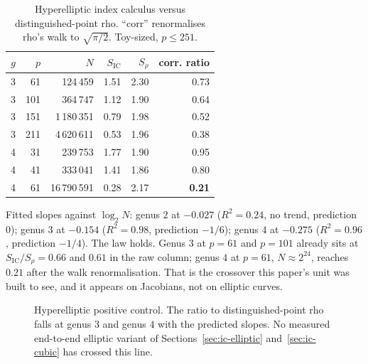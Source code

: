 \begin{table}[t]
\centering
\small
\caption{Hyperelliptic index calculus versus distinguished-point rho.
  ``corr'' renormalises rho's walk to $\sqrt{\pi/2}$. Toy-sized,
  $p\le 251$.}
\label{tab:hyper}
\begin{tabular}{@{}rrrrrr@{}}
\toprule
$g$ & $p$ & $N$ & $S_{\mathrm{IC}}$ & $S_{\rho}$ & corr. ratio \\
\midrule
3 & 61 & 124\,459 & 1.51 & 2.30 & 0.73 \\
3 & 101 & 364\,747 & 1.12 & 1.90 & 0.64 \\
3 & 151 & 1\,180\,351 & 0.79 & 1.98 & 0.52 \\
3 & 211 & 4\,620\,611 & 0.53 & 1.96 & 0.38 \\
4 & 31 & 239\,753 & 1.77 & 1.90 & 0.95 \\
4 & 41 & 333\,041 & 1.41 & 1.86 & 0.80 \\
4 & 61 & 16\,790\,591 & 0.28 & 2.17 & \textbf{0.21} \\
\bottomrule
\end{tabular}
\end{table}

Fitted slopes against $\log_2 N$: genus $2$ at $-0.027$ ($R^2=0.24$,
no trend, prediction $0$); genus $3$ at $-0.154$ ($R^2=0.98$,
prediction $-1/6$); genus $4$ at $-0.275$ ($R^2=0.96$, prediction
$-1/4$). The law holds. Genus $3$ at $p=61$ and $p=101$ already sits
at $S_{\mathrm{IC}}/S_{\rho}=0.66$ and $0.61$ in the raw column; genus
$4$ at $p=61$, $N\approx 2^{24}$, reaches $0.21$ after the walk
renormalisation. That is the crossover this paper's unit was built to
see, and it appears on Jacobians, not on elliptic curves.

\begin{figure}[t]
\centering
{}
\caption{Hyperelliptic positive control. The ratio to distinguished-point
  rho falls at genus $3$ and genus $4$ with the predicted slopes.
  No measured end-to-end elliptic variant of Sections~\ref{sec:ic-elliptic}
  and~\ref{sec:ic-cubic} has crossed this line.}
\label{fig:hyper}
\end{figure}
